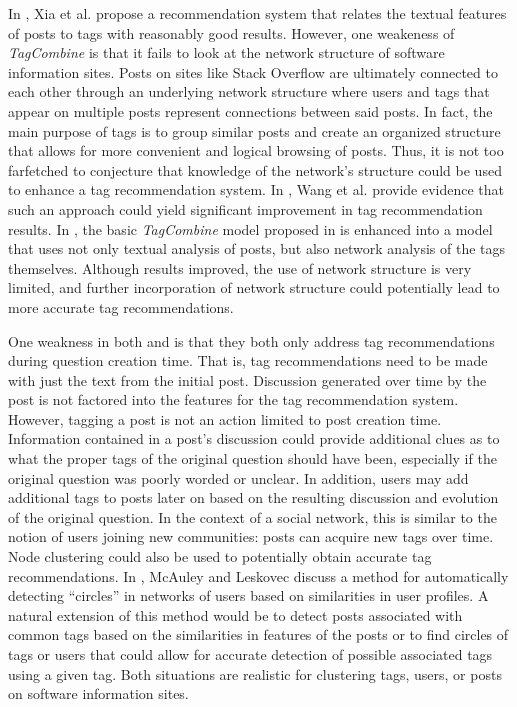 \documentclass[10pt]{IEEEtran}
\begin{document}
In \cite{1}, Xia et al. propose a recommendation system that relates the textual features of posts to tags with reasonably good results. However, one weakeness of \textit{TagCombine} is that it fails to look at the network structure of software information sites. Posts on sites like Stack Overflow are ultimately connected to each other through an underlying network structure where users and tags that appear on multiple posts represent connections between said posts. In fact, the main purpose of tags is to group similar posts and create an organized structure that allows for more convenient and logical browsing of posts. Thus, it is not too farfetched to conjecture that knowledge of the network’s structure could be used to enhance a tag recommendation system. In \cite{5}, Wang et al. provide evidence that such an approach could yield significant improvement in tag recommendation results. In \cite{5}, the basic \textit{TagCombine} model proposed in \cite{1} is enhanced into a model that uses not only textual analysis of posts, but also network analysis of the tags themselves. Although results improved, the use of network structure is very limited, and further incorporation of network structure could potentially lead to more accurate tag recommendations.

One weakness in both \cite{1} and \cite{5} is that they both only address tag recommendations during question creation time. That is, tag recommendations need to be made with just the text from the initial post. Discussion generated over time by the post is not factored into the features for the tag recommendation system. However, tagging a post is not an action limited to post creation time.
Information contained in a post’s discussion could provide additional clues as to what the proper tags of the original question should have been, especially if the original question was poorly worded or unclear. In addition, users may add additional tags to posts later on based on the resulting discussion and evolution of the original question. In the context of a social network, this is similar to the notion of users joining new communities: posts can acquire new tags over time. Node clustering could also be used to potentially obtain accurate tag recommendations. In \cite{2}, McAuley and Leskovec discuss a method for automatically detecting ``circles'' in networks of users based on similarities in user profiles. A natural extension of this method would be to detect posts associated with common tags based on the similarities in features of the posts or to find circles of tags or users that could allow for accurate detection of possible associated tags using a given tag. Both situations are realistic for clustering tags, users, or posts on software information sites.
\end{document}
